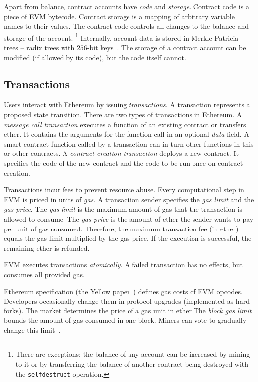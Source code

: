 Apart from balance, contract accounts have \textit{code} and \textit{storage}.
Contract code is a piece of EVM bytecode.
Contract storage is a mapping of arbitrary variable names to their values.
The contract code controls all changes to the balance and storage of the account.
\footnote{There are exceptions: the balance of any account can be increased by mining to it or by transferring the balance of another contract being destroyed with the \texttt{selfdestruct} operation.}
Internally, account data is stored in Merkle Patricia trees -- radix trees with $256$-bit keys~\cite{MPTSpec, Buchman14}.
The storage of a contract account can be modified (if allowed by its code), but the code itself cannot.


\subsection{Transactions}

Users interact with Ethereum by issuing \textit{transactions}.
A transaction represents a proposed state transition.
There are two types of transactions in Ethereum.
A \textit{message call transaction} executes a function of an existing contract or transfers ether.
It contains the arguments for the function call in an optional \textit{data} field.
A smart contract function called by a transaction can in turn other functions in this or other contracts.
A \textit{contract creation transaction} deploys a new contract.
It specifies the code of the new contract and the code to be run once on contract creation.

Transactions incur fees to prevent resource abuse.
Every computational step in EVM is priced in units of \emph{gas}.
A transaction sender specifies the \textit{gas limit} and the \textit{gas price}.
The \textit{gas limit} is the maximum amount of gas that the transaction is allowed to consume.
The \textit{gas price} is the amount of ether the sender wants to pay per unit of gas consumed.
Therefore, the maximum transaction fee (in ether) equals the gas limit multiplied by the gas price.
If the execution is successful, the remaining ether is refunded.

EVM executes transactions \textit{atomically}.
A failed transaction has no effects, but consumes all provided gas.

Ethereum specification (the Yellow paper~\cite{Wood2014}) defines gas costs of EVM opcodes.
Developers occasionally change them in protocol upgrades (implemented as hard forks).
The market determines the price of a gas unit in ether
The \textit{block gas limit} bounds the amount of gas consumed in one block.
Miners can vote to gradually change this limit~\cite{Jnnk15}.

